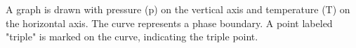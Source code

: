 A graph is drawn with pressure (p) on the vertical axis and temperature (T) on the horizontal axis. The curve represents a phase boundary. A point labeled "triple" is marked on the curve, indicating the triple point.